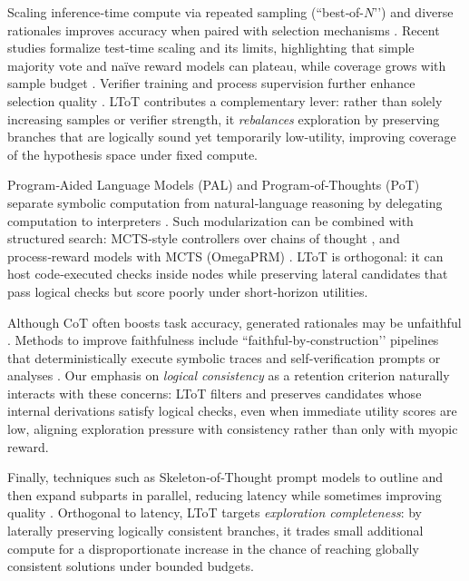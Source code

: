 \documentclass{article}
\begin{document}
Scaling inference‑time compute via repeated sampling (“best‑of-\(N\)’’) and diverse rationales improves accuracy when paired with selection mechanisms \citep{cobbe2021verifier,wang2022selfconsistency}. Recent studies formalize test‑time scaling and its limits, highlighting that simple majority vote and naïve reward models can plateau, while coverage grows with sample budget \citep{brown2024monkeys}. Verifier training and process supervision further enhance selection quality \citep{lightman2023verify,zhang2024generativeverifiers}. LToT contributes a complementary lever: rather than solely increasing samples or verifier strength, it \emph{rebalances} exploration by preserving branches that are logically sound yet temporarily low‑utility, improving coverage of the hypothesis space under fixed compute.

Program‑Aided Language Models (PAL) and Program‑of‑Thoughts (PoT) separate symbolic computation from natural‑language reasoning by delegating computation to interpreters \citep{gao2022pal,chen2022pot}. Such modularization can be combined with structured search: MCTS‑style controllers over chains of thought \citep{xie2024mcts}, and process‑reward models with MCTS (OmegaPRM) \citep{luo2024omegaprm}. LToT is orthogonal: it can host code‑executed checks inside nodes while preserving lateral candidates that pass logical checks but score poorly under short‑horizon utilities.

Although CoT often boosts task accuracy, generated rationales may be unfaithful \citep{turpin2023dontsaysay,lanham2023measurefaithfulness}. Methods to improve faithfulness include “faithful‑by‑construction’’ pipelines that deterministically execute symbolic traces \citep{lyu2023faithfulcot} and self‑verification prompts or analyses \citep{weng2022selfverification}. Our emphasis on \emph{logical consistency} as a retention criterion naturally interacts with these concerns: LToT filters and preserves candidates whose internal derivations satisfy logical checks, even when immediate utility scores are low, aligning exploration pressure with consistency rather than only with myopic reward.

Finally, techniques such as Skeleton‑of‑Thought prompt models to outline and then expand subparts in parallel, reducing latency while sometimes improving quality \citep{ning2023sot}. Orthogonal to latency, LToT targets \emph{exploration completeness}: by laterally preserving logically consistent branches, it trades small additional compute for a disproportionate increase in the chance of reaching globally consistent solutions under bounded budgets.
\end{document}
